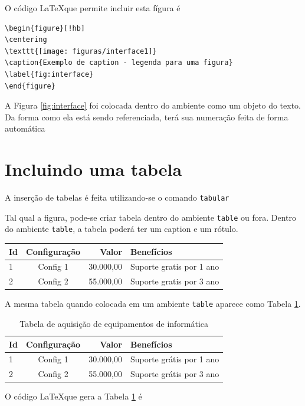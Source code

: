 O código \LaTeX que permite incluir esta fígura é

\begin{verbatim}
\begin{figure}[!hb]
\centering
\texttt{[image: figuras/interface1]} 
\caption{Exemplo de caption - legenda para uma figura}
\label{fig:interface}
\end{figure} 
\end{verbatim}
                             

A Figura \ref{fig:interface} foi colocada dentro do ambiente  como um objeto do
texto. Da forma como ela está sendo referenciada, terá sua numeração feita de
forma automática

\section{Incluindo uma tabela}

A inserção de tabelas é feita utilizando-se o comando \verb|tabular|

Tal qual a figura, pode-se criar tabela dentro do ambiente \verb|table| ou fora.
Dentro do ambiente \verb|table|, a tabela poderá ter um caption e um rótulo.

\begin{tabular}{|l|c|r|p{4cm}|}
\hline
Id & Configuração & Valor & Benefícios \\
\hline
1 & Config 1 & 30.000,00 & Suporte gratis por 1 ano \\
\hline	
2 & Config 2 & 55.000,00 & Suporte gratis por 3 ano \\
\hline
\end{tabular}

A mesma tabela quando colocada em um ambiente \verb|table| aparece como Tabela
\ref{tab:TabEquipamentos}.

\begin{table}[h]
\centering
\caption{Tabela de aquisição de equipamentos de informática}
\begin{tabular}{|l|c|r|p{4cm}|}
\hline
Id & Configuração & Valor & Benefícios \\
\hline
1 & Config 1 & 30.000,00 & Suporte grátis por 1 ano \\
\hline	
2 & Config 2 & 55.000,00 & Suporte grátis por 3 ano \\
\hline
\end{tabular} 
\label{tab:TabEquipamentos}
\end{table}

O código \LaTeX que gera a Tabela \ref{tab:TabEquipamentos} é 

